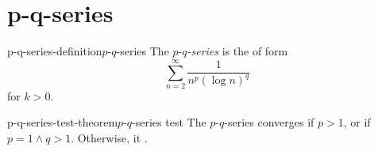 \documentclass[preview]{standalone}
\begin{document}
\section{p-q-series}

\begin{snippetdefinition}{p-q-series-definition}{\(p\text{-}q\)-series}
    The \emph{\(p\text{-}q\)-series} is the \series of form
    \[\sum_{n=2}^\infty \frac{1}{n^p{(\log n)}^q}\]
    for \(k > 0\).
\end{snippetdefinition}

\begin{snippettheorem}{p-q-series-test-theorem}{\(p\text{-}q\)-series test}
    The \(p\text{-}q\)-series converges if \(p > 1\), or if \(p=1 \land q>1\).
    Otherwise, it \seriesdiverges.
\end{snippettheorem}
\end{document}
